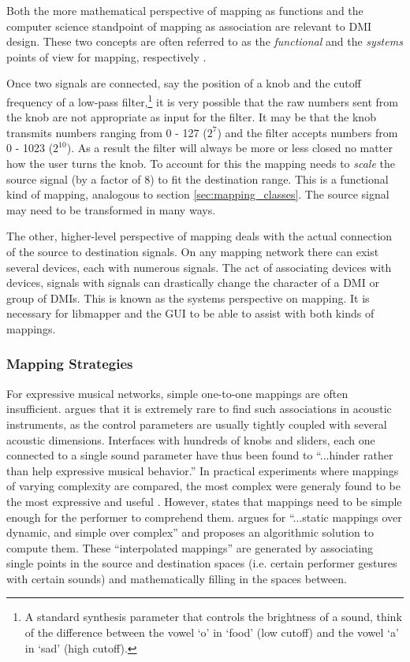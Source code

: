 Both the more mathematical perspective of mapping as functions and the computer science standpoint of mapping as association are relevant to DMI design. These two concepts are often referred to as the \emph{functional} and the \emph{systems} points of view for mapping, respectively \cite{two_types_of_mapping}. 

Once two signals are connected, say the position of a knob and the cutoff frequency of a low-pass filter,\footnote{A standard synthesis parameter that controls the brightness of a sound, think of the difference between the vowel `o' in `food' (low cutoff) and the vowel `a' in `sad' (high cutoff).} it is very possible that the raw numbers sent from the knob are not appropriate as input for the filter. It may be that the knob transmits numbers ranging from 0 - 127 ($2^7$) and the filter accepts numbers from 0 - 1023 ($2^{10}$). As a result the filter will always be more or less closed no matter how the user turns the knob. To account for this the mapping needs to \emph{scale} the source signal (by a factor of 8) to fit the destination range. This is a functional kind of mapping, analogous to section \ref{sec:mapping_classes}. The source signal may need to be transformed in many ways. 

The other, higher-level perspective of mapping deals with the actual connection of the source to destination signals. On any mapping network there can exist several devices, each with numerous signals. The act of associating devices with devices, signals with signals can drastically change the character of a DMI or group of DMIs. This is known as the systems perspective on mapping. It is necessary for libmapper and the GUI to be able to assist with both kinds of mappings.

	\subsubsection{Mapping Strategies}

For expressive musical networks, simple one-to-one mappings are often insufficient.   argues that it is extremely rare to find such associations in acoustic instruments, as the control parameters are usually tightly coupled with several acoustic dimensions. Interfaces with hundreds of knobs and sliders, each one connected to a single sound parameter have thus been found to ``...hinder rather than help expressive musical behavior.''  In practical experiments where mappings of varying complexity are compared, the most complex were generaly found to be the most expressive and useful \cite{mapping_complexity_experiments}. However,  states that mappings need to be simple enough for the performer to comprehend them.  argues for ``...static mappings over dynamic, and simple over complex'' and proposes an algorithmic solution to compute them. These ``interpolated mappings'' are generated by associating single points in the source and destination spaces (i.e. certain performer gestures with certain sounds) and mathematically filling in the spaces between.

